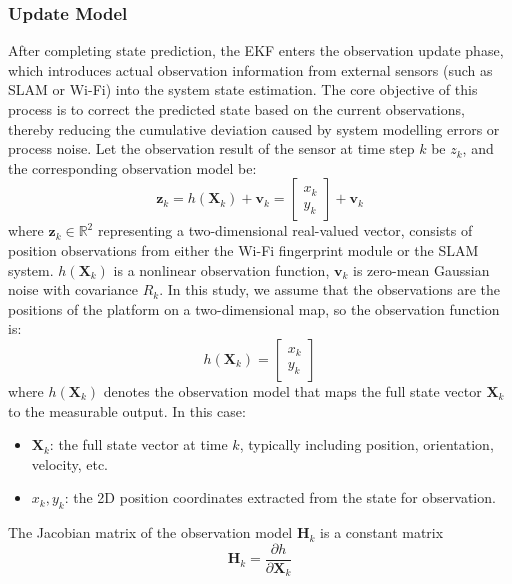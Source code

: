 \documentclass[12pt,a4paper]{article}
\numberwithin{equation}{section}
\begin{document}
\subsubsection{Update Model}
After completing state prediction, the EKF enters the observation update phase, which introduces actual observation information from external sensors (such as SLAM or Wi-Fi) into the system state estimation. The core objective of this process is to correct the predicted state based on the current observations, thereby reducing the cumulative deviation caused by system modelling errors or process noise. Let the observation result of the sensor at time step $k$ be $z_k$, and the corresponding observation model be:
\begin{equation}
\mathbf{z}_k = h(\mathbf{X}_k) + \mathbf{v}_k =
\begin{bmatrix}
x_k \\
y_k
\end{bmatrix} + \mathbf{v}_k
\label{eq:observation_model}
\end{equation}
where \(\mathbf{z}_k \in \mathbb{R}^2\) representing a two-dimensional real-valued vector, consists of position observations from either the Wi-Fi fingerprint module or the SLAM system. $h(\mathbf{X}_k)$ is a nonlinear observation function, $\mathbf{v}_k$ is zero-mean Gaussian noise with covariance $R_k$. In this study, we assume that the observations are the positions of the platform on a two-dimensional map, so the observation function is:
\begin{equation}
h(\mathbf{X}_k) = 
\begin{bmatrix}
x_k \\
y_k
\end{bmatrix}
\end{equation}
\noindent
where $h(\mathbf{X}_k)$ denotes the observation model that maps the full state vector $\mathbf{X}_k$ to the measurable output. In this case:
\begin{itemize}
  \item $\mathbf{X}_k$: the full state vector at time $k$, typically including position, orientation, velocity, etc.
  \item $x_k, y_k$: the 2D position coordinates extracted from the state for observation.
\end{itemize}
The Jacobian matrix of the observation model $\mathbf{H}_k$ is a constant matrix
\begin{equation}
\mathbf{H}_k = \frac{\partial h}{\partial \mathbf{X}_k}
\end{equation}
\end{document}
